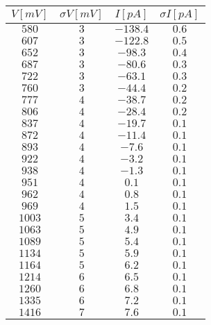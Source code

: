 \begin{tabular}{cccc}
\hline
	$V[mV]$ & $\sigma V[mV]$ & $I[pA]$ & $\sigma I[pA]$\\ 
\hline
	$580$ & $3$ & $-138.4$ & $0.6$ \\
	$607$ & $3$ & $-122.8$ & $0.5$ \\
	$652$ & $3$ & $-98.3$ & $0.4$ \\
	$687$ & $3$ & $-80.6$ & $0.3$ \\
	$722$ & $3$ & $-63.1$ & $0.3$ \\
	$760$ & $3$ & $-44.4$ & $0.2$ \\
	$777$ & $4$ & $-38.7$ & $0.2$ \\
	$806$ & $4$ & $-28.4$ & $0.2$ \\
	$837$ & $4$ & $-19.7$ & $0.1$ \\
	$872$ & $4$ & $-11.4$ & $0.1$ \\
	$893$ & $4$ & $-7.6$ & $0.1$ \\
	$922$ & $4$ & $-3.2$ & $0.1$ \\
	$938$ & $4$ & $-1.3$ & $0.1$ \\
	$951$ & $4$ & $0.1$ & $0.1$ \\
	$962$ & $4$ & $0.8$ & $0.1$ \\
	$969$ & $4$ & $1.5$ & $0.1$ \\
	$1003$ & $5$ & $3.4$ & $0.1$ \\
	$1063$ & $5$ & $4.9$ & $0.1$ \\
	$1089$ & $5$ & $5.4$ & $0.1$ \\
	$1134$ & $5$ & $5.9$ & $0.1$ \\
	$1164$ & $5$ & $6.2$ & $0.1$ \\
	$1214$ & $6$ & $6.5$ & $0.1$ \\
	$1260$ & $6$ & $6.8$ & $0.1$ \\
	$1335$ & $6$ & $7.2$ & $0.1$ \\
	$1416$ & $7$ & $7.6$ & $0.1$ \\
\hline
\end{tabular}
